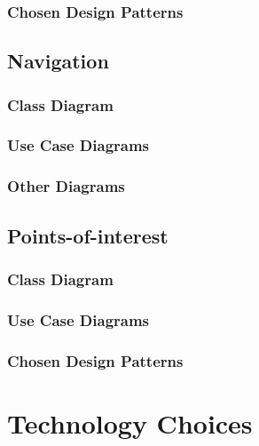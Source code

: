 \documentclass{article}
\begin{document}
        \subsubsection{Chosen Design Patterns}
    \subsection{Navigation}
        \subsubsection{Class Diagram}
        \subsubsection{Use Case Diagrams}
        \subsubsection{Other Diagrams}
    \subsection{Points-of-interest}
        \subsubsection{Class Diagram}
        \subsubsection{Use Case Diagrams}
        \subsubsection{Chosen Design Patterns}
\section{Technology Choices}

\end{document}
